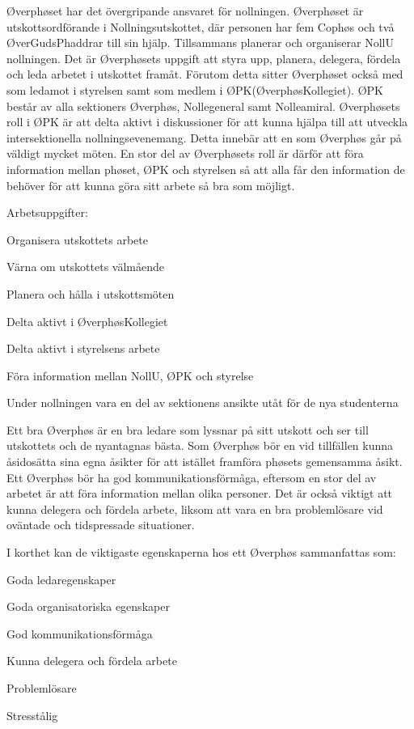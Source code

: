 \documentclass[10pt]{article}
\def\post{Øverphøs}
\def\doctitle{Kravprofil för \post}
\begin{document}
\heading{\doctitle}


Øverphøset har det övergripande ansvaret för nollningen. Øverphøset är utskottsordförande i Nollningsutskottet, där personen har fem Cophøs och två ØverGudsPhaddrar till sin hjälp. Tillsammans planerar och organiserar NollU nollningen. Det är Øverphøsets uppgift att styra upp, planera, delegera, fördela och leda arbetet i utskottet framåt. Förutom detta sitter Øverphøset också med som ledamot i styrelsen samt som medlem i ØPK(ØverphøsKollegiet). ØPK består av alla sektioners Øverphøs, Nollegeneral samt Nolleamiral. Øverphøsets roll i ØPK är att delta aktivt i diskussioner för att kunna hjälpa till att utveckla intersektionella nollningsevenemang. Detta innebär att en som Øverphøs går på väldigt mycket möten. En stor del av Øverphøsets roll är därför att föra information mellan phøset, ØPK och styrelsen så att alla får den information de behöver för att kunna göra sitt arbete så bra som möjligt.


Arbetsuppgifter:
\begin{dashlist}
    \item Organisera utskottets arbete
    \item Värna om utskottets välmående
    \item Planera och hålla i utskottsmöten
    \item Delta aktivt i ØverphøsKollegiet
    \item Delta aktivt i styrelsens arbete
    \item Föra information mellan NollU, ØPK och styrelse
    \item Under nollningen vara en del av sektionens ansikte utåt för de nya studenterna
\end{dashlist}

Ett bra {\post} är en bra ledare som lyssnar på sitt utskott och ser till utskottets och de nyantagnas bästa. Som Øverphøs bör en vid tillfällen kunna åsidosätta sina egna åsikter för att istället framföra phøsets gemensamma åsikt. Ett Øverphøs bör ha god kommunikationsförmåga, eftersom en stor del av arbetet är att föra information mellan olika personer. Det är också viktigt att kunna delegera och fördela arbete, liksom att vara en bra problemlösare vid oväntade och tidspressade situationer.

I korthet kan de viktigaste egenskaperna hos ett {\post} sammanfattas som:
\begin{dashlist}
    \item Goda ledaregenskaper
    \item Goda organisatoriska egenskaper
    \item God kommunikationsförmåga
    \item Kunna delegera och fördela arbete
    \item Problemlösare
    \item Stresstålig
\end{dashlist}
\end{document}
